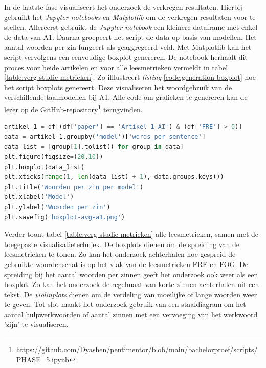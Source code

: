 In de laatste fase visualiseert het onderzoek de verkregen resultaten. Hierbij gebruikt het \textit{Jupyter-notebooks} en \textit{Matplotlib} om de verkregen resultaten voor te stellen. Allereerst gebruikt de \textit{Jupyter-notebook} een kleinere dataframe met enkel de data van A1. Daarna groepeert het script de data op basis van modellen. Het aantal woorden per zin fungeert als geaggregeerd veld. Met Matplotlib kan het script vervolgens een eenvoudige boxplot genereren. De notebook herhaalt dit proces voor beide artikelen en voor alle leesmetrieken vermeldt in tabel \ref{table:verg-studie-metrieken}. Zo illlustreert \textit{listing} \ref{code:generation-boxplot} hoe het script boxplots genereert. Deze visualiseren het woordgebruik van de verschillende taalmodellen bij A1. Alle code om grafieken te genereren kan de lezer op de GitHub-repository\footnote{https://github.com/Dyashen/pentimentor/blob/main/bachelorproef/scripts/PHASE\_5.ipynb} terugvinden. 

\begin{lstlisting}[language=Python, caption={Code om een boxplot voor het aantal woorden per zin te genereren.}, label={code:generation-boxplot}]	
artikel_1 = df[(df['paper'] == 'Artikel 1 AI') & (df['FRE'] > 0)]
data = artikel_1.groupby('model')['words_per_sentence']
data_list = [group[1].tolist() for group in data]
plt.figure(figsize=(20,10))
plt.boxplot(data_list)
plt.xticks(range(1, len(data_list) + 1), data.groups.keys())
plt.title('Woorden per zin per model')
plt.xlabel('Model')
plt.ylabel('Woorden per zin')
plt.savefig('boxplot-avg-a1.png')
\end{lstlisting}

Verder toont tabel \ref{table:verg-studie-metrieken} alle leesmetrieken, samen met de toegepaste visualisatietechniek. De boxplots dienen om de spreiding van de leesmetrieken te tonen. Zo kan het onderzoek achterhalen hoe gespreid de gebruikte woordenschat is op het vlak van de leesmetrieken FRE en FOG. De spreiding bij het aantal woorden per zinnen geeft het onderzoek ook weer als een boxplot. Zo kan het onderzoek de regelmaat van korte zinnen achterhalen uit een tekst. De \textit{violinplots} dienen om de verdeling van moeilijke of lange woorden weer te geven. Tot slot maakt het onderzoek gebruik van een staafdiagram om het aantal hulpwerkwoorden of aantal zinnen met een vervoeging van het werkwoord 'zijn' te visualiseren.

